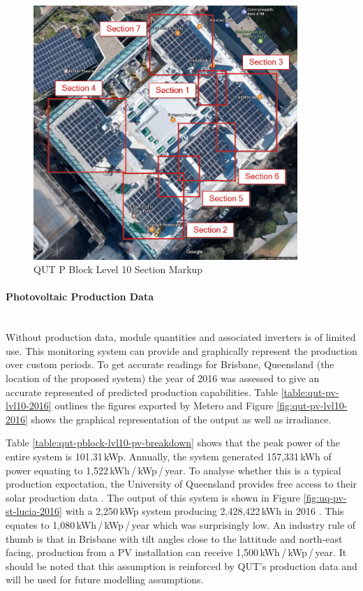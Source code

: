 \begin{figure}[H]
	\hfill\includegraphics[width=100mm]{images/qut-pblock-section-markup}\hspace*{\fill}
	\caption{QUT P Block Level 10 Section Markup} 
	\label{fig:qut-map-pv-pblock-lvl0-markup}
\end{figure}

\paragraph{Photovoltaic Production Data}
~\\
Without production data, module quantities and associated inverters is of limited use. This monitoring system can provide and graphically represent the production over custom periods. To get accurate readings for Brisbane, Queensland (the location of the proposed system) the year of 2016 was assessed to give an accurate represented of predicted production capabilities. Table \ref{table:qut-pv-lvl10-2016} outlines the figures exported by Metero and Figure \ref{fig:qut-pv-lvl10-2016} shows the graphical representation of the output as well as irradiance. 
\newline

Table \ref{table:qut-pblock-lvl10-pv-breakdown} shows that the peak power of the entire system is 101.31\,kWp. Annually, the system generated 157,331\,kWh of power equating to 1,522\,kWh\,/\,kWp\,/\,year. To analyse whether this is a typical production expectation, the University of Queensland provides free access to their solar production data \cite{website:UQData1}. The output of this system is shown in Figure \ref{fig:uq-pv-st-lucia-2016} with a 2,250\,kWp system producing 2,428,422\,kWh in 2016 \cite{website:UQData1}. This equates to 1,080\,kWh\,/\,kWp\,/\,year which was surprisingly low. An industry rule of thumb is that in Brisbane with tilt angles close to the lattitude and north-east facing, production from a PV installation can receive 1,500\,kWh\,/\,kWp\,/\,year. It should be noted that this assumption is reinforced by QUT's production data and will be used for future modelling assumptions.   

